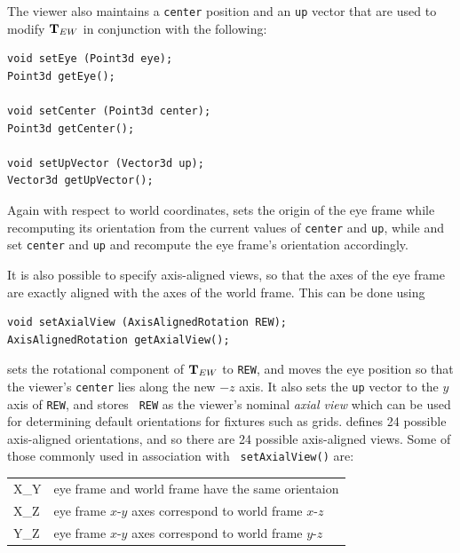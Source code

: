 The viewer also maintains a {\tt center} position and an {\tt up}
vector that are used to modify ${\bf T}_{EW}$ in conjunction
with the following:
%
\begin{lstlisting}[]
void setEye (Point3d eye);
Point3d getEye();

void setCenter (Point3d center);
Point3d getCenter();

void setUpVector (Vector3d up);
Vector3d getUpVector();
\end{lstlisting}
%
Again with respect to world coordinates,
sets the origin of the eye frame while recomputing its orientation
from the current values of {\tt center} and {\tt up}, while
and
set {\tt center} and {\tt up} and recompute the eye frame's
orientation accordingly.

It is also possible to specify axis-aligned views, so that the axes of
the eye frame are exactly aligned with the axes of the world
frame. This can be done using
%
\begin{lstlisting}[]
void setAxialView (AxisAlignedRotation REW);
AxisAlignedRotation getAxialView();
\end{lstlisting}
%
 sets the rotational
component of ${\bf T}_{EW}$ to {\tt REW}, and moves the eye position so
that the viewer's {\tt center} lies along the new $-z$ axis. It also
sets the {\tt up} vector to the $y$ axis of {\tt REW}, and stores {\tt
REW} as the viewer's nominal {\it axial view} which can be used for
determining default orientations for fixtures such as grids.
 defines 24 possible
axis-aligned orientations, and so there are 24 possible axis-aligned
views. Some of those commonly used in association with {\tt
setAxialView()} are:

\begin{center}
\begin{tabular}{|l|l|}
\hline 
X\_Y & eye frame and world frame have the same orientaion\\
X\_Z & eye frame $x$-$y$ axes correspond to world frame $x$-$z$\\
Y\_Z & eye frame $x$-$y$ axes correspond to world frame $y$-$z$\\
\hline
\end{tabular}
\end{center}

